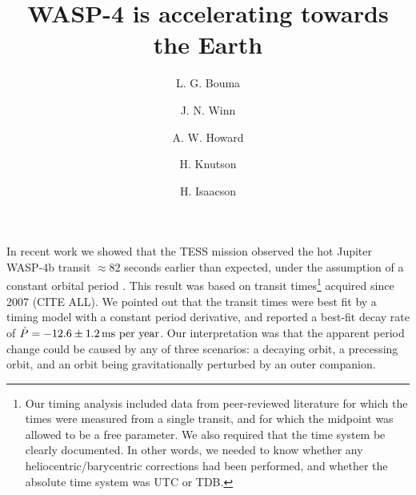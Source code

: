 \documentclass[RNAAS]{aastex62}
\begin{document}
\title{WASP-4 is accelerating towards the Earth}


\author[0000-0002-0514-5538]{L. G. Bouma}
%
\author[0000-0002-4265-047X]{J. N. Winn}
%
\author[0000-0001-8638-0320]{A. W. Howard}
%
\author{H. Knutson}
%
\author[0000-0002-0531-1073]{H. Isaacson}
%



\section{}

In recent work we showed that the TESS mission observed the hot
Jupiter WASP-4b transit $\approx 82$ seconds earlier than expected,
under the assumption of a constant orbital period
\citep{bouma_wasp-4b_2019}.  This result was based on transit
times\footnote{ Our timing analysis included data from peer-reviewed
literature for which the times were measured from a single transit,
and for which the midpoint was allowed to be a free parameter. We also
required that the time system be clearly documented. In other words,
we needed to know
whether any heliocentric/barycentric corrections had been performed,
and whether the absolute time system was UTC or TDB.} acquired since
2007 (CITE ALL).  We pointed out that the transit times were best fit
by a timing model with a constant period derivative, and reported a
best-fit decay rate of $\dot{P} = -12.6 \pm 1.2\,{\rm ms\ per\ year}$.
Our interpretation was that the apparent period change could be caused
by any of three scenarios: a decaying orbit, a precessing orbit, and
an orbit being gravitationally perturbed by an outer companion.
\end{document}
